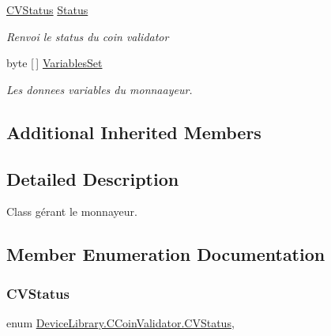 \begin{DoxyCompactItemize}
\mbox{\hyperlink{class_device_library_1_1_c_coin_validator_a62ce7ca9d0cc8ef92edb58f06a34add1}{C\+V\+Status}} \mbox{\hyperlink{class_device_library_1_1_c_coin_validator_ac45ed64d9685ac636e48b00510c7654e}{Status}}
\begin{DoxyCompactList}\small\item\em Renvoi le status du coin validator \end{DoxyCompactList}\item 
byte \mbox{[}$\,$\mbox{]} \mbox{\hyperlink{class_device_library_1_1_c_coin_validator_a538e6fc08186ba969f190503cdc828c2}{Variables\+Set}}
\begin{DoxyCompactList}\small\item\em Les donnees variables du monnaayeur. \end{DoxyCompactList}\end{DoxyCompactItemize}
\subsection*{Additional Inherited Members}


\subsection{Detailed Description}
Class gérant le monnayeur. 



\subsection{Member Enumeration Documentation}
\mbox{\label{class_device_library_1_1_c_coin_validator_a62ce7ca9d0cc8ef92edb58f06a34add1}} 
\subsubsection{\texorpdfstring{C\+V\+Status}{CVStatus}}
{\footnotesize\ttfamily enum \mbox{\hyperlink{class_device_library_1_1_c_coin_validator_a62ce7ca9d0cc8ef92edb58f06a34add1}{Device\+Library.\+C\+Coin\+Validator.\+C\+V\+Status}}\hspace{0.3cm}{\ttfamily [strong]}, {\ttfamily [protected]}}





